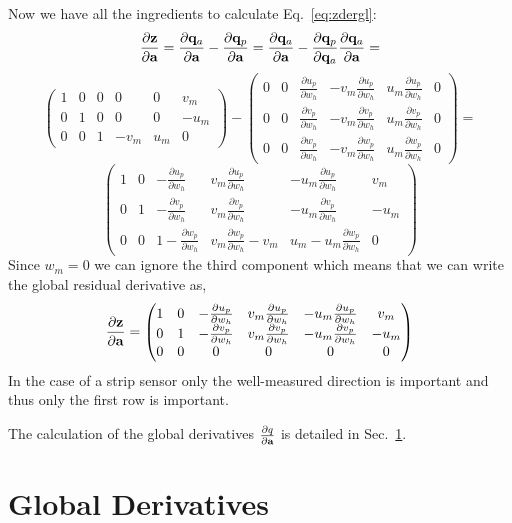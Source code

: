 \documentclass{article}
\def\vec#1{\ensuremath{\mathrm{\bf #1}}}
\def\partder#1#2{\ensuremath{\frac{\partial #1}{\partial #2}}}
\begin{document}
Now we have all the ingredients to calculate Eq.~\ref{eq:zdergl}:
\[
 \partder{\vec{z}}{\vec{a}}  =  \partder{\vec{q}_a}{\vec{a}} - \partder{\vec{q}_p}{\vec{a}} = 
\partder{\vec{q}_a}{\vec{a}} -  \partder{\vec{q}_p}{\vec{q}_a} \partder{\vec{q}_a}{\vec{a}} =
\]
\[
\begin{pmatrix}
1 & 0 & 0 & 0       & 0 & v_m \\
0 & 1 & 0 & 0 & 0        & -u_m \\
0 & 0 & 1 & -v_m  & u_m  & 0        
\end{pmatrix}
-
 \begin{pmatrix}
 0 & 0 & \partder{u_p}{w_h} & -v_m \partder{u_p}{w_h}  & u_m \partder{u_p}{w_h} & 0 \\
0 & 0 & \partder{v_p}{w_h} & -v_m \partder{v_p}{w_h}   & u_m \partder{v_p}{w_h} & 0 \\
0 & 0 & \partder{w_p}{w_h} & -v_m \partder{w_p}{w_h}   & u_m \partder{w_p}{w_h} & 0
\end{pmatrix}
 =
\]
\[
\begin{pmatrix}
1 & 0 & -\partder{u_p}{w_h} & v_m \partder{u_p}{w_h} & -u_m \partder{u_p}{w_h} & v_m \\
0 & 1 & - \partder{v_p}{w_h} & v_m \partder{v_p}{w_h} & -u_m \partder{v_p}{w_h} & -u_m \\
0 & 0 & 1-\partder{w_p}{w_h} & v_m \partder{w_p}{w_h} -v_m & u_m-u_m \partder{w_p}{w_h} & 0 
\end{pmatrix}
\]
Since $w_m=0$ we can ignore the third component which means that we can 
write the global residual derivative as,
\[
\partder{\vec{z}}{\vec{a}} = 
\begin{pmatrix}
1 & 0 & -\partder{u_p}{w_h} & v_m \partder{u_p}{w_h} & -u_m \partder{u_p}{w_h} & v_m \\
0 & 1 & - \partder{v_p}{w_h} & v_m \partder{v_p}{w_h} & -u_m \partder{v_p}{w_h} & -u_m \\
0 & 0 & 0 & 0 & 0 & 0
\end{pmatrix}
\]
In the case of a strip sensor only the well-measured direction is important and thus only 
the first row is important.



The calculation of the global derivatives $\partder{q}{\vec{a}}$ is detailed in Sec.~\ref{sec:globalders}.  







\section{Global Derivatives}
\label{sec:globalders}
\end{document}
